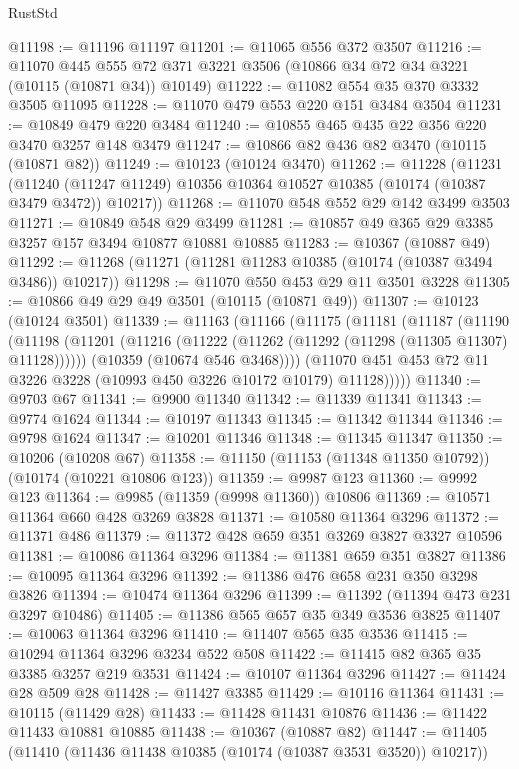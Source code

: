 \begin{lexlean}{RustStd}
\begin{coremodule}
@11198 := @11196 @11197
@11201 := @11065 @556 @372 @3507
@11216 := @11070
    @445
    @555
    @72
    @371
    @3221
    @3506
    (@10866 @34 @72 @34 @3221 (@10115 (@10871 @34)) @10149)
@11222 := @11082 @554 @35 @370 @3332 @3505 @11095
@11228 := @11070 @479 @553 @220 @151 @3484 @3504
@11231 := @10849 @479 @220 @3484
@11240 := @10855 @465 @435 @22 @356 @220 @3470 @3257 @148 @3479
@11247 := @10866 @82 @436 @82 @3470 (@10115 (@10871 @82))
@11249 := @10123 (@10124 @3470)
@11262 := @11228
    (@11231
      (@11240 (@11247 @11249) @10356 @10364 @10527 @10385 (@10174 (@10387 @3479 @3472)) @10217))
@11268 := @11070 @548 @552 @29 @142 @3499 @3503
@11271 := @10849 @548 @29 @3499
@11281 := @10857 @49 @365 @29 @3385 @3257 @157 @3494 @10877 @10881 @10885
@11283 := @10367 (@10887 @49)
@11292 := @11268 (@11271 (@11281 @11283 @10385 (@10174 (@10387 @3494 @3486)) @10217))
@11298 := @11070 @550 @453 @29 @11 @3501 @3228
@11305 := @10866 @49 @29 @49 @3501 (@10115 (@10871 @49))
@11307 := @10123 (@10124 @3501)
@11339 := @11163
    (@11166
      (@11175
        (@11181
          (@11187
            (@11190
              (@11198
                (@11201 (@11216 (@11222 (@11262 (@11292 (@11298 (@11305 @11307) @11128))))))
                (@10359 (@10674 @546 @3468))))
            (@11070 @451 @453 @72 @11 @3226 @3228 (@10993 @450 @3226 @10172 @10179) @11128)))))
@11340 := @9703 @67
@11341 := @9900 @11340
@11342 := @11339 @11341
@11343 := @9774 @1624
@11344 := @10197 @11343
@11345 := @11342 @11344
@11346 := @9798 @1624
@11347 := @10201 @11346
@11348 := @11345 @11347
@11350 := @10206 (@10208 @67)
@11358 := @11150 (@11153 (@11348 @11350 @10792)) (@10174 (@10221 @10806 @123))
@11359 := @9987 @123
@11360 := @9992 @123
@11364 := @9985 (@11359 (@9998 @11360)) @10806
@11369 := @10571 @11364 @660 @428 @3269 @3828
@11371 := @10580 @11364 @3296
@11372 := @11371 @486
@11379 := @11372 @428 @659 @351 @3269 @3827 @3327 @10596
@11381 := @10086 @11364 @3296
@11384 := @11381 @659 @351 @3827
@11386 := @10095 @11364 @3296
@11392 := @11386 @476 @658 @231 @350 @3298 @3826
@11394 := @10474 @11364 @3296
@11399 := @11392 (@11394 @473 @231 @3297 @10486)
@11405 := @11386 @565 @657 @35 @349 @3536 @3825
@11407 := @10063 @11364 @3296
@11410 := @11407 @565 @35 @3536
@11415 := @10294 @11364 @3296 @3234 @522 @508
@11422 := @11415 @82 @365 @35 @3385 @3257 @219 @3531
@11424 := @10107 @11364 @3296
@11427 := @11424 @28 @509 @28
@11428 := @11427 @3385
@11429 := @10116 @11364
@11431 := @10115 (@11429 @28)
@11433 := @11428 @11431 @10876
@11436 := @11422 @11433 @10881 @10885
@11438 := @10367 (@10887 @82)
@11447 := @11405 (@11410 (@11436 @11438 @10385 (@10174 (@10387 @3531 @3520)) @10217))

\end{coremodule}
\end{lexlean}
